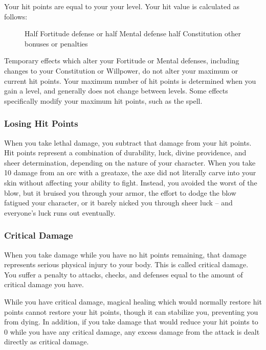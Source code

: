 Your hit points are equal to your  \mtimes your level. Your hit value is calculated as follows:

\begin{figure}[h]
    \centering Half Fortitude defense or half Mental defense \add half Constitution \add other bonuses or penalties
\end{figure}

 Temporary effects which alter your Fortitude or Mental defenses, including changes to your Constitution or Willpower, do not alter your maximum or current hit points.
Your maximum number of hit points is determined when you gain a level, and generally does not change between levels.
Some effects specifically modify your maximum hit points, such as the  spell.

\subsubsection{Losing Hit Points}
When you take lethal damage, you subtract that damage from your hit points.
 Hit points represent a combination of durability, luck, divine providence, and sheer determination, depending on the nature of your character. When you take 10 damage from an orc with a greataxe, the axe did not literally carve into your skin without affecting your ability to fight. Instead, you avoided the worst of the blow, but it bruised you through your armor, the effort to dodge the blow fatigued your character, or it barely nicked you through sheer luck -- and everyone's luck runs out eventually.

\subsubsection{Critical Damage}\label{Critical Damage}
When you take damage while you have no hit points remaining, that damage represents serious physical injury to your body. This is called critical damage. You suffer a penalty to attacks, checks, and defenses equal to the amount of critical damage you have.

While you have critical damage, magical healing which would normally restore hit points cannot restore your hit points, though it can stabilize you, preventing you from dying. In addition, if you take damage that would reduce your hit points to 0 while you have any critical damage, any excess damage from the attack is dealt directly as critical damage.


